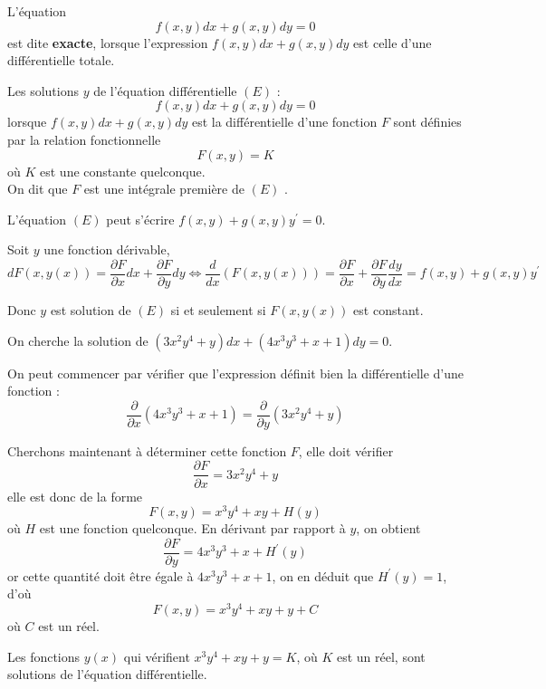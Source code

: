 \documentclass[12pt]{article}
\newcounter{definition}
\newcounter{proposition}
\newcounter{exercice}
\begin{document}
\begin{definition}
L'équation
$$
f(x, y) dx + g(x, y) dy = 0
$$
est dite \textbf{exacte}, lorsque l'expression $f(x, y) dx + g(x, y) dy$ est celle d'une différentielle totale.
\end{definition}

\begin{proposition}
Les solutions $y$ de l'équation différentielle $(E)$ :
$$
f(x, y) dx + g(x, y) dy = 0
$$
lorsque $f(x, y) dx + g(x, y) dy$ est la différentielle d'une fonction $F$ sont définies par la relation fonctionnelle
$$
F(x, y) = K
$$
où $K$ est une constante quelconque.\\
On dit que $F$ est \og  une intégrale première de $(E)$ \fg{} .
\end{proposition}

\begin{demonstration}
L'équation $(E)$ peut s'écrire $f(x, y) + g(x, y) y^{\prime} = 0$.

Soit $y$ une fonction dérivable,
$$
dF(x, y(x)) = \frac{\partial F}{\partial x} dx + \frac{\partial F}{\partial y} dy \Longleftrightarrow \frac{d}{dx}(F(x, y(x))) = \frac{\partial F}{\partial x} + \frac{\partial F}{\partial y} \frac{dy}{dx} = f(x, y) + g(x, y) y^{\prime}
$$

Donc $y$ est solution de $(E)$ si et seulement si $F(x, y(x))$ est constant.
\end{demonstration}

\begin{exercice}
On cherche la solution de $\left(3 x^{2} y^{4}+y\right) dx + \left(4 x^{3} y^{3}+x+1\right) dy = 0$.
\end{exercice}

\begin{corrige}
On peut commencer par vérifier que l'expression définit bien la différentielle d'une fonction :
$$
\frac{\partial}{\partial x}\left(4 x^{3} y^{3}+x+1\right) = \frac{\partial}{\partial y}\left(3 x^{2} y^{4}+y\right)
$$

Cherchons maintenant à déterminer cette fonction $F$, elle doit vérifier
$$
\frac{\partial F}{\partial x} = 3 x^{2} y^{4}+y
$$
elle est donc de la forme
$$
F(x, y) = x^{3} y^{4}+xy+H(y)
$$
où $H$ est une fonction quelconque. En dérivant par rapport à $y$, on obtient
$$
\frac{\partial F}{\partial y} = 4 x^{3} y^{3}+x+H^{\prime}(y)
$$
or cette quantité doit être égale à $4 x^{3} y^{3}+x+1$, on en déduit que $H^{\prime}(y)=1$, d'où
$$
F(x, y) = x^{3} y^{4}+xy+y+C
$$
où $C$ est un réel.

Les fonctions $y(x)$ qui vérifient $x^{3} y^{4}+xy+y=K$, où $K$ est un réel, sont solutions de l'équation différentielle.
\end{corrige}
\end{document}
